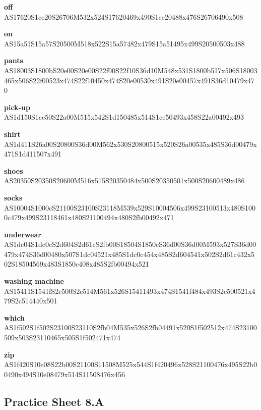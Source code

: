 \documentclass{article}
\begin{document}
\begin{glossary}
\textbf{off}\\
AS17620S1ce20S26706M532x524S17620469x490S1ce20488x476S26706490x508

\textbf{on}\\
AS15a51S15a57S20500M518x522S15a57482x479S15a51495x499S20500503x488

\textbf{pants}\\
AS18003S1800bS20e00S20e00S22f00S22f10S36d10M548x531S1800b517x506S18003465x506S22f00523x474S22f10450x474S20e00530x491S20e00457x491S36d10479x470

\textbf{pick-up}\\
AS1d150S1ce50S22a00M515x542S1d150485x514S1ce50493x458S22a00492x493

\textbf{shirt}\\
AS1d411S26a00S20800S36d00M562x530S20800515x520S26a00535x485S36d00479x471S1d411507x491

\textbf{shoes}\\
AS20350S20350S20600M516x515S20350484x500S20350501x500S20600489x486

\textbf{socks}\\
AS10004S1000cS21100S23100S23118M539x529S10004506x499S23100513x480S1000c479x499S23118461x480S21100494x480S2fb00492x471

\textbf{underwear}\\
AS1dc04S1dc0cS2d604S2d61cS2fb00S18504S1850cS36d00S36d00M593x527S36d00479x474S36d00480x507S1dc04521x485S1dc0c454x485S2d604541x502S2d61c432x502S18504569x483S1850c408x485S2fb00494x521

\textbf{washing machine}\\
AS15411S1541fS2c500S2c514M561x526S15411493x474S1541f484x493S2c500521x479S2c514440x501

\textbf{which}\\
AS1f502S1f502S23100S23110S2fb04M535x526S2fb04491x520S1f502512x474S23100509x503S23110465x505S1f502471x474

\textbf{zip}\\
AS1f420S10e08S22b00S21100S11508M525x544S1f420496x528S21100476x495S22b00490x494S10e08479x514S11508476x456

\end{glossary}

\subsection{Practice Sheet 8.A}
\end{document}
